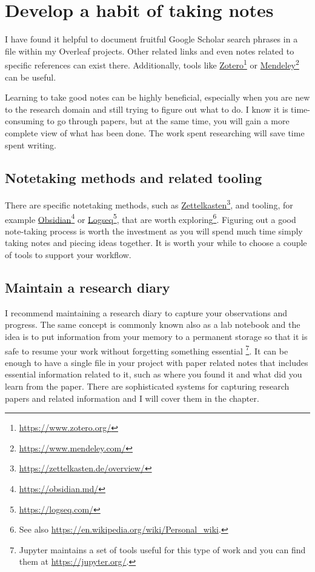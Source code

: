 \section{Develop a habit of taking notes}

I have found it helpful to document fruitful Google Scholar search phrases in a file within my Overleaf projects.
Other related links and even notes related to specific references can exist there.
Additionally, tools like \href{https://www.zotero.org/}{Zotero}\footnote{\url{https://www.zotero.org/}} or \href{https://www.mendeley.com/}{Mendeley}\footnote{\url{https://www.mendeley.com/}} can be useful. %

Learning to take good notes can be highly beneficial, especially when you are new to the research domain and still trying to figure out what to do.
I know it is time-consuming to go through papers, but at the same time, you will gain a more complete view of what has been done.
The work spent researching will save time spent writing.

\subsection{Notetaking methods and related tooling}

There are specific notetaking methods, such as \href{https://zettelkasten.de/overview/}{Zettelkasten}\footnote{\url{https://zettelkasten.de/overview/}}, and tooling, for example \href{https://obsidian.md/}{Obsidian}\footnote{\url{https://obsidian.md/}} or \href{https://logseq.com/}{Logseq}\footnote{\url{https://logseq.com/}}, that are worth exploring\footnote{See also \url{https://en.wikipedia.org/wiki/Personal_wiki}.}.
Figuring out a good note-taking process is worth the investment as you will spend much time simply taking notes and piecing ideas together.
It is worth your while to choose a couple of tools to support your workflow.

\subsection{Maintain a research diary}

I recommend maintaining a research diary to capture your observations and progress.
The same concept is commonly known also as a lab notebook and the idea is to put information from your memory to a permanent storage so that it is safe to resume your work without forgetting something essential \citep{samlab2020}\footnote{Jupyter maintains a set of tools useful for this type of work and you can find them at \url{https://jupyter.org/}.}.
It can be enough to have a single file in your project with paper related notes that includes essential information related to it, such as where you found it and what did you learn from the paper.
There are sophisticated systems for capturing research papers and related information and I will cover them in the  chapter.

